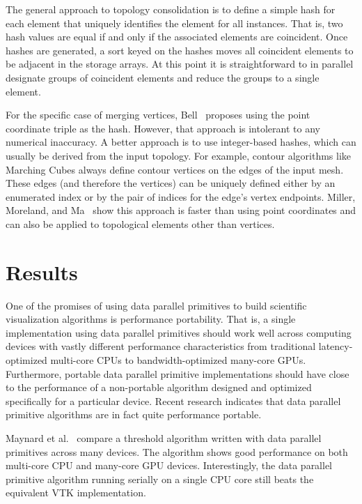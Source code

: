 \documentclass{superfri}
\newcommand*{\scite}[1]{~\cite{#1}}
\newcommand{\etal}{et al.\xspace}
\begin{document}
The general approach to topology consolidation is to define a simple hash
for each element that uniquely identifies the element for all instances.
That is, two hash values are equal if and only if the associated elements
are coincident. Once hashes are generated, a sort keyed on the hashes moves
all coincident elements to be adjacent in the storage arrays. At this point
it is straightforward to in parallel designate groups of coincident
elements and reduce the groups to a single element.

For the specific case of merging vertices, Bell\scite{Bell2010} proposes
using the point coordinate triple as the hash. However, that approach is
intolerant to any numerical inaccuracy. A better approach is to use
integer-based hashes, which can usually be derived from the input topology.
For example, contour algorithms like Marching Cubes always define contour
vertices on the edges of the input mesh. These edges (and therefore the
vertices) can be uniquely defined either by an enumerated index or by the
pair of indices for the edge's vertex endpoints. Miller, Moreland, and
Ma\scite{Miller2014} show this approach is faster than using point
coordinates and can also be applied to topological elements other than
vertices.


\section{Results}

\noindent
One of the promises of using data parallel primitives to build scientific
visualization algorithms is performance portability. That is, a single
implementation using data parallel primitives should work well across
computing devices with vastly different performance characteristics from
traditional latency-optimized multi-core CPUs to bandwidth-optimized
many-core GPUs. Furthermore, portable data parallel primitive
implementations should have close to the performance of a non-portable
algorithm designed and optimized specifically for a particular device.
Recent research indicates that data parallel primitive algorithms are in
fact quite performance portable.

Maynard \etal\scite{Maynard2013} compare a threshold algorithm written with
data parallel primitives across many devices. The algorithm shows good
performance on both multi-core CPU and many-core GPU devices.
Interestingly, the data parallel primitive algorithm running serially on a
single CPU core still beats the equivalent VTK implementation.
\end{document}
